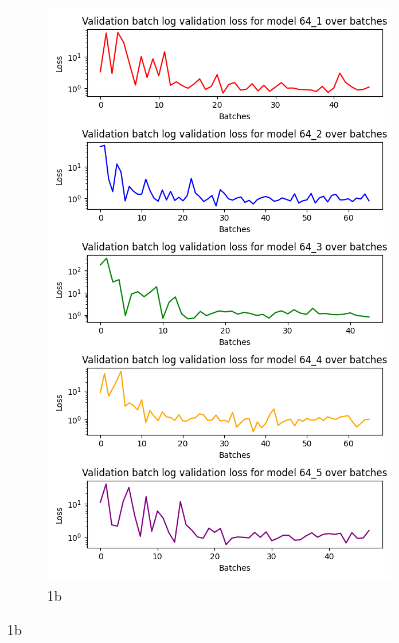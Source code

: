 \begin{figure}[H]
\begin{subfigure}{0.5\textwidth}
        \includegraphics[width=0.95\linewidth]{Images/Results/Validation_loss_64.png}
        \caption{1b}
        \label{fig:v-loss-64}
    \end{subfigure}
    \label{fig:v-loss}
\end{figure}

\newpage


